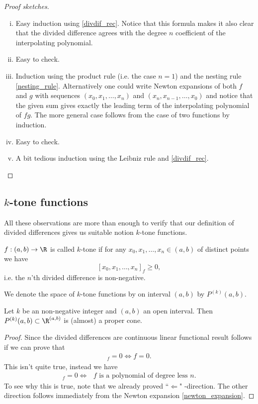 \begin{proof}[Proof sketches]
	\begin{enumerate}[(i)]
		\item Easy induction using \ref{divdif_rec}. Notice that this formula makes it also clear that the divided difference agrees with the degree $n$ coefficient of the interpolating polynomial.
		\item Easy to check.
		\item Induction using the product rule (i.e. the case $n = 1$) and the nesting rule \ref{nesting_rule}. Alternatively one could write Newton expansions of both $f$ and $g$ with sequences $(x_{0}, x_{1}, \ldots, x_{n})$ and $(x_{n}, x_{n - 1}, \ldots, x_{0})$ and notice that the given sum gives exactly the leading term of the interpolating polynomial of $f g$. The more general case follows from the case of two functions by induction.
		\item Easy to check.
		\item A bit tedious induction using the Leibniz rule and \ref{divdif_rec}.
	\end{enumerate}
\end{proof}

\subsection{$k$-tone functions}

All these observations are more than enough to verify that our definition of divided differences gives us suitable notion $k$-tone functions.

\begin{maar}
	$f : (a, b) \to \R$ is called $k$-tone if for any $x_{0}, x_{1}, \ldots, x_{n} \in (a, b)$ of distinct points we have
	\[
		[x_{0}, x_{1}, \ldots, x_{n}]_{f} \geq 0,
	\]
	i.e. the $n$'th divided difference is non-negative.
\end{maar}

We denote the space of $k$-tone functions by on interval $(a, b)$ by $P^{(k)}(a, b)$.

\begin{lause}
	Let $k$ be an non-negative integer and $(a, b)$ an open interval. Then $P^{(k)}(a, b) \subset \R^{(a, b)}$ is (almost) a proper cone.
\end{lause}
\begin{proof}
	Since the divided differences are continuous linear functional result follows if we can prove that
	\begin{align*}
		[\cdot, \cdot, \ldots, \cdot]_{f} = 0 \Leftrightarrow f = 0.
	\end{align*}
	This isn't quite true, instead we have
	\begin{align*}
		[\cdot, \cdot, \ldots, \cdot]_{f} = 0 \Leftrightarrow \text{ $f$ is a polynomial of degree less $n$}.
	\end{align*}
	To see why this is true, note that we already proved ``$\Leftarrow$" -direction. The other direction follows immediately from the Newton expansion \ref{newton_expansion}.
\end{proof}


